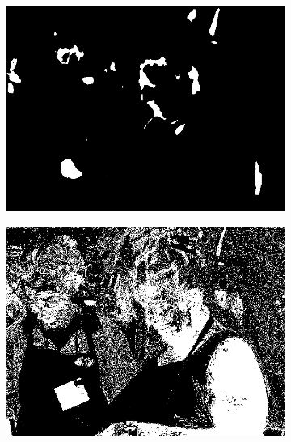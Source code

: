 \begin{figure}[h]
{\begin{subfigure}[b]{0.23\textwidth}
         \includegraphics[width=\textwidth]{images/results/cross_st/outdoor_cooking_dark_light_skinny_3.png}
     \end{subfigure}
    \hfill
     \begin{subfigure}[b]{0.23\textwidth}
         \centering
         \includegraphics[width=\textwidth]{images/results/cross_st/outdoor_cooking_dark_light_bayes.png}
     \end{subfigure}}
     

\end{figure}
